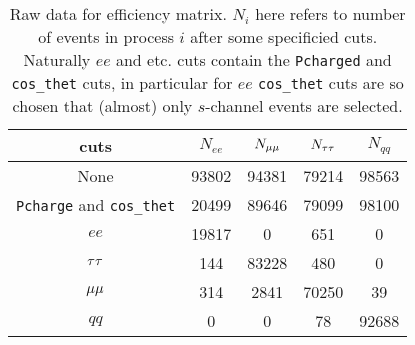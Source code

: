 \begin{table}[ht]
	\centering
	\begin{tabular}{ccccc}
		\toprule
		cuts & $N_{ee}$  & $N_{\mu\mu}$  & $N_{\tau\tau}$  & $N_{qq}$  \\
		\midrule
None & \num{93802} & \num{94381} & \num{79214} & \num{98563}\\
\verb|Pcharge| and \verb|cos_thet| & \num{20499} & \num{89646} & \num{79099} & \num{98100}\\
$ee$ & \num{19817} & \num{0} & \num{651} & \num{0}\\
$\tau\tau$ & \num{144} & \num{83228} & \num{480} & \num{0}\\
$\mu\mu$ & \num{314} & \num{2841} & \num{70250} & \num{39}\\
$qq$ & \num{0} & \num{0} & \num{78} & \num{92688}\\
		\bottomrule
	\end{tabular}
	\cprotect\caption{Raw data for efficiency matrix. $N_i$ here refers to number of events in process $i$ after some specificied cuts. Naturally $ee$ and etc. cuts contain the \verb|Pcharged| and \verb|cos_thet| cuts, in particular for $ee$ \verb|cos_thet| cuts are so chosen that (almost) only $s$-channel events are selected.}
	\label{tab:label}
\end{table}
